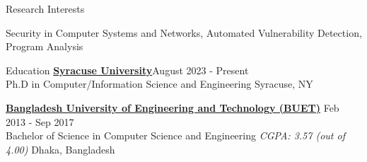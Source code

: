 \documentclass[12pt]{resume} %
\begin{document}
\begin{rSection}{Research Interests}

Security in Computer Systems and Networks, Automated Vulnerability Detection, Program Analysis
\end{rSection}

\begin{rSection}{Education}
{\bf \href{https://ecs.syracuse.edu/}{Syracuse University}}\hfill {August 2023 - Present} \\
Ph.D in Computer/Information Science and Engineering \hfill {Syracuse, NY}

{\bf \href{https://cse.buet.ac.bd/}{Bangladesh University of Engineering and Technology (BUET)}} \hfill {Feb 2013 - Sep 2017}\\
Bachelor of Science in Computer Science and Engineering  {\it CGPA: 3.57 (out of 4.00)} \hfill Dhaka, Bangladesh
\end{rSection}

\end{document}
